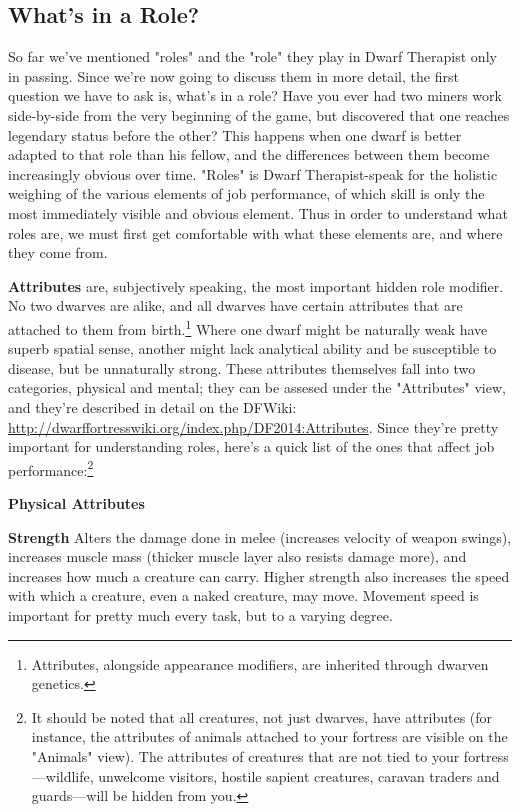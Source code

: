 \documentclass[]{article}
\newcommand{\boldlist}[1] {
\vspace{12pt}
\noindent \textbf{#1}
}
\begin{document}
\subsection{What's in a Role?}
\label{What's in a Role?}
So far we've mentioned "roles" and the "role" they play in  Dwarf Therapist only in passing. Since we're
now going to discuss them in more detail, the first question we have to ask is, what's in a role?
Have you ever had two miners work side-by-side from the very beginning of the game, but
discovered that one reaches legendary status before the other? This happens when one dwarf is
better adapted to that role than his fellow, and the differences between them become increasingly
obvious over time. "Roles" is Dwarf Therapist-speak for the holistic weighing of the various
elements of job performance, of which skill is only the most immediately visible and obvious element.
Thus in order to understand what roles are, we must first get comfortable with what these elements are,
and where they come from.

\textbf{Attributes} are, subjectively speaking, the most important hidden role modifier. No two
dwarves are alike, and all dwarves have certain attributes that are attached to them from
birth.\footnote{Attributes, alongside appearance modifiers, are inherited through dwarven genetics.}
Where one dwarf might be naturally weak have superb spatial sense, another might lack analytical
ability and be susceptible to disease, but be unnaturally strong. These attributes themselves fall into
two categories, physical and mental; they can be assesed under the "Attributes" view, and they're
described in detail on the DFWiki: \url{http://dwarffortresswiki.org/index.php/DF2014:Attributes}. Since
they're pretty important for understanding roles, here's a quick list of the ones that affect job
performance:\footnote{It should be noted that all creatures, not just dwarves, have attributes (for
instance, the attributes of animals attached to your fortress are visible on the "Animals" view). The
attributes of creatures that are not tied to your fortress---wildlife, unwelcome visitors, hostile
sapient creatures, caravan traders and guards---will be hidden from you.}

\boldlist{\indent Physical Attributes}

\boldlist{Strength} Alters the damage done in melee (increases velocity
of weapon swings), increases muscle mass (thicker muscle layer also resists damage more), and increases
how much a creature can carry. Higher strength also increases the speed with which a creature, even a
naked creature, may move. Movement speed is important for pretty much every task, but to a varying
degree.
\end{document}
